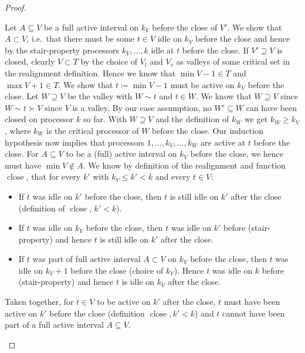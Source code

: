 \documentclass[a4paper]{article}
\DeclareMathOperator{\close}{close}
\begin{document}
\begin{proof}
\begin{description}
      Let $A \subseteq V$ be a full active interval on $k_V$ before the close of $V'$.
      We show that $A \subset V$, i.e.\ that there must be some $t \in V$ idle on $k_V$ before the close and hence by the stair-property processors $k_V, \ldots, k$ idle at $t$ before the close.
      If $V' \supseteq V$ is closed, clearly $V \subset T$ by the choice of $V_l$ and $V_r$ as valleys of some critical set in the realignment definition.
      Hence we know that $\min V - 1 \in T$ and $\max V + 1 \in T$.
      We show that $t \coloneqq \min V - 1$ must be active on $k_V$ before the close.
      Let $W \supseteq V$ be the valley with $W \sim t$ and $t \in W$.
      We know that $W \supseteq V$ since $W \sim t \succ V$ since $V$ is a valley.
      By our case assumption, no $W' \subseteq W$ can have been closed on processor $k$ so far.
      With $W \supseteq V$ and the definition of $k_W$ we get $k_W \geq k_V$, where $k_W$ is the critical processor of $W$ before the close.
      Our induction hypothesis now implies that processors $1, \ldots, k_V, \ldots, k_W$ are active at $t$ before the close.
      For $A \subseteq V$ to be a (full) active interval on $k_V$ before the close, we hence must have $\min V \notin A$.
      We know by definition of the realignment and function $\close$, that for every $k'$ with $k_V \leq k' < k$ and every $t \in V$:
      \begin{itemize}
        \item
          If $t$ was idle on $k'$ before the close, then $t$ is still idle on $k'$ after the close (definition of $\close$, $k' < k$).
        \item
          If $t$ was idle on $k_V$ before the close, then $t$ was idle on $k'$ before (stair-property) and hence $t$ is still idle on $k'$ after the close.
        \item
          If $t$ was part of full active interval $A \subset V$ on $k_V$ before the close, then $t$ was idle on $k_V + 1$ before the close (choice of $k_V$).
          Hence $t$ was idle on $k$ before (stair-property) and hence $t$ is idle on $k_V$ after the close.
      \end{itemize}
      Taken together, for $t \in V$ to be active on $k'$ after the close, $t$ must have been active on $k'$ before the close (definition $\close, k' < k$) and $t$ cannot have been part of a full active interval $A \subseteq V$.

\end{description}
\end{proof}
\end{document}
